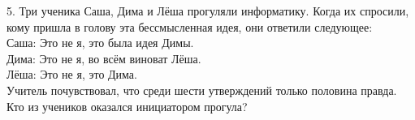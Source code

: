 5. Три ученика Саша, Дима и Лёша прогуляли информатику. Когда их спросили, кому пришла в голову эта бессмысленная идея, они ответили следующее:\\
Саша: Это не я, это была идея Димы.\\
Дима: Это не я, во всём виноват Лёша.\\
Лёша: Это не я, это Дима.\\
Учитель почувствовал, что среди шести утверждений только половина правда. Кто из учеников оказался инициатором прогула?\\
